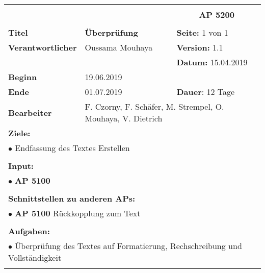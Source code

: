 \clearpage
\begin{table}[!h]
 \begin{center}
  \begin{tabular}{|p{35mm}||p{55mm}|p{50mm}||p{40mm}|}
   \hline
   \multicolumn{3}{|l||}{\textbf{}} & \multicolumn{1}{c|}{}\\
   \multicolumn{3}{|l||}{\textbf{}} & \multicolumn{1}{c|}{\textbf{AP 5200}}\\
   \multicolumn{3}{|l||}{\textbf{}} & \multicolumn{1}{c|}{}\\
   \hline\hline
   \textbf{Titel} & \multicolumn{2}{p{7cm}||}{\textbf{Überprüfung}} & \textbf{Seite:} 1 von 1\\
   \hline
   \textbf{Verantwortlicher} & \multicolumn{2}{l||}{Oussama Mouhaya} & \textbf{Version:} 1.1\\
   \hline
   \multicolumn{3}{|l||}{} & \textbf{Datum:} 15.04.2019\\
   \hline\hline
   \textbf{Beginn} & \multicolumn{2}{l||}{19.06.2019} & \\
   \hline
   \textbf{Ende} & \multicolumn{2}{l||}{01.07.2019} & \textbf{Dauer}: 12 Tage\\
   \hline\hline
   \textbf{Bearbeiter} & \multicolumn{3}{l|}{F. Czorny, F. Schäfer, M. Strempel, O. Mouhaya, V. Dietrich}\\
   \hline\hline
   \multicolumn{4}{|p{150mm}|}{\textbf{Ziele:}}\\
   \multicolumn{4}{|p{150mm}|}{$\bullet$ Endfassung des Textes Erstellen}\\
   \multicolumn{4}{|p{150mm}|}{}\\
   \multicolumn{4}{|p{150mm}|}{\textbf{Input:}}\\
   \multicolumn{4}{|p{150mm}|}{$\bullet$ \textbf{AP 5100}}\\
   \multicolumn{4}{|p{150mm}|}{}\\
   \multicolumn{4}{|p{150mm}|}{\textbf{Schnittstellen zu anderen APs:}}\\
   \multicolumn{4}{|p{150mm}|}{$\bullet$ \textbf{AP 5100} Rückkopplung zum Text}\\
   \multicolumn{4}{|p{150mm}|}{}\\
   \multicolumn{4}{|p{150mm}|}{\textbf{Aufgaben:}}\\
   \multicolumn{4}{|p{150mm}|}{$\bullet$ Überprüfung des Textes auf Formatierung, Rechschreibung und Vollständigkeit}\\
   \multicolumn{4}{|p{150mm}|}{}\\
   \hline
  \end{tabular}
 \end{center}
\end{table}
\clearpage
